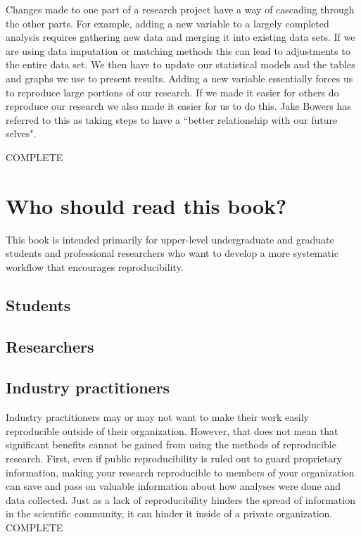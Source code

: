 \documentclass[ChapterTOCs,krantz1]{krantz}\usepackage{graphicx, color}
\begin{document}
Changes made to one part of a research project have a way of cascading through the other parts. For example, adding a new variable to a largely completed analysis requires gathering new data and merging it into existing data sets. If we are using data imputation or matching methods this can lead to adjustments to the entire data set. We then have to update our statistical models and the tables and graphs we use to present results. Adding a new variable essentially forces us to reproduce large portions of our research. If we made it easier for others do reproduce our research we also made it easier for us to do this. Jake Bowers has referred to this as taking steps to have a ``better relationship with our future selves".\cite{Bowers2011}

COMPLETE

\section{Who should read this book?}

This book is intended primarily for upper-level undergraduate and graduate students and professional researchers who want to develop a more systematic workflow that encourages reproducibility.

\subsection{Students}

\subsection{Researchers}

\subsection{Industry practitioners}

Industry practitioners may or may not want to make their work easily reproducible outside of their organization. However, that does not mean that significant benefits cannot be gained from using the methods of reproducible research. First, even if public reproducibility is ruled out to guard proprietary information, making your research reproducible to members of your organization can save and pass on valuable information about how analyses were done and data collected. Just as a lack of reproducibility hinders the spread of information in the scientific community, it can hinder it inside of a private organization. COMPLETE
\end{document}
